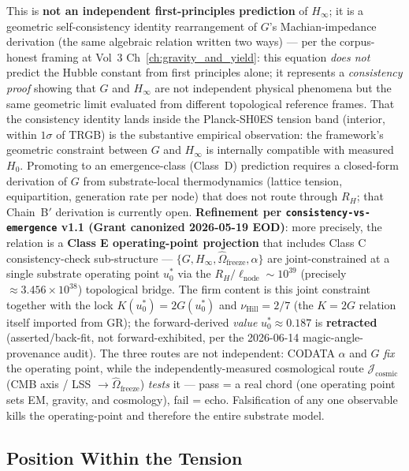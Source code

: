 \begin{examplebox}
This is \textbf{not an independent first-principles prediction} of $H_\infty$; it is a geometric self-consistency identity rearrangement of $G$'s Machian-impedance derivation (the same algebraic relation written two ways) --- per the corpus-honest framing at Vol~3 Ch~\ref{ch:gravity_and_yield}: this equation \emph{does not} predict the Hubble constant from first principles alone; it represents a \emph{consistency proof} showing that $G$ and $H_\infty$ are not independent physical phenomena but the same geometric limit evaluated from different topological reference frames. That the consistency identity lands inside the Planck-SH0ES tension band (interior, within $1\sigma$ of TRGB) is the substantive empirical observation: the framework's geometric constraint between $G$ and $H_\infty$ is internally compatible with measured $H_0$. Promoting to an emergence-class (Class~D) prediction requires a closed-form derivation of $G$ from substrate-local thermodynamics (lattice tension, equipartition, generation rate per node) that does not route through $R_H$; that Chain~B$'$ derivation is currently open. \textbf{Refinement per \texttt{consistency-vs-emergence} v1.1 (Grant canonized 2026-05-19 EOD)}: more precisely, the relation is a \textbf{Class E operating-point projection} that includes Class C consistency-check sub-structure --- $\{G, H_\infty, \hat{\Omega}_{\text{freeze}}, \alpha\}$ are joint-constrained at a single substrate operating point $u_0^*$ via the $R_H/\ell_{\text{node}} \sim 10^{39}$ (precisely $\approx 3.456\times10^{38}$) topological bridge. The firm content is this joint constraint together with the lock $K(u_0^*) = 2G(u_0^*)$ and $\nu_{\text{Hill}} = 2/7$ (the $K = 2G$ relation itself imported from GR); the forward-derived \emph{value} $u_0^* \approx 0.187$ is \textbf{retracted} (asserted/back-fit, not forward-exhibited, per the 2026-06-14 magic-angle-provenance audit). The three routes are not independent: CODATA $\alpha$ and $G$ \emph{fix} the operating point, while the independently-measured cosmological route $\mathcal{J}_{\text{cosmic}}$ (CMB axis / LSS $\to \hat{\Omega}_{\text{freeze}}$) \emph{tests} it --- pass = a real chord (one operating point sets EM, gravity, and cosmology), fail = echo. Falsification of any one observable kills the operating-point and therefore the entire substrate model.
\end{examplebox}

\subsection{Position Within the Tension}

